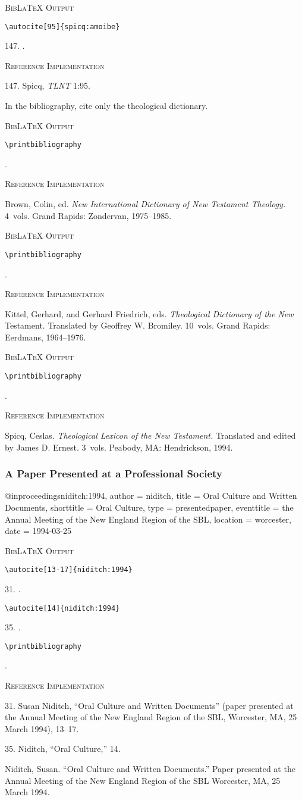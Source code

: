 \documentclass[a4paper]{article}
\newcommand\citetest[5]{%
  {\textsc{BibLaTeX Output}\par
   \nobreak
   \texttt{\textbackslash autocite[#2]\{#5\}}\par
   \color{biblatex-colour}
   #1. \cite[#2]{#5}.\par
   \color{black}
   \texttt{\textbackslash autocite[#4]\{#5\}}\par
   \color{biblatex-colour}
   #3. \cite[#4]{#5}.\par
   \color{black}
   \texttt{\textbackslash printbibliography}\par
   \color{biblatex-colour}
   \hangindent\bibindent\bibentrycite{#5}.\par}}
\newcommand\citetestlexns[3]{%
  {\textsc{BibLaTeX Output}\par
   \nobreak
   \texttt{\textbackslash autocite[#2]\{#3\}}\par
   \color{biblatex-colour}
   #1. \cite[#2]{#3}.\par}}
\newcommand\citetestbib[1]{%
  {\textsc{BibLaTeX Output}\par
   \nobreak
   \color{black}
   \texttt{\textbackslash printbibliography}\par
   \color{biblatex-colour}
   \hangindent\bibindent\bibentrycite{#1}.\par}}
\newenvironment{refimp}{%
  \begin{minipage}{\linewidth}
    \setlength{\parskip}{1ex}
    \textsc{Reference Implementation}\par
    \nobreak
    \color{reference-colour}
}{\end{minipage}}
\newenvironment{vb}{%
  \setlength{\parskip}{0pt}
  \verbatim}{\endverbatim}
\begin{document}
\citetestlexns{147}{95}{spicq:amoibe}

\begin{refimp}
  147. Spicq, \emph{TLNT} 1:95.
\end{refimp}

\bigskip

In the bibliography, cite only the theological dictionary.

\citetestbib{NIDNTT}

\begin{refimp}
  \hangindent\bibindent Brown, Colin, ed. \emph{New International Dictionary
  of New Testament Theology.} 4~vols. Grand Rapids: Zondervan, 1975–1985.
\end{refimp}

\citetestbib{TDNT}

\begin{refimp}
  \hangindent\bibindent Kittel, Gerhard, and Gerhard Friedrich, eds.
  \emph{Theological Dictionary of the New} Testament. Translated by Geoffrey
  W. Bromiley. 10~vols. Grand Rapids: Eerdmans, 1964–1976.
\end{refimp}

\citetestbib{TLNT}

\begin{refimp}
  \hangindent\bibindent Spicq, Ceslas. \emph{Theological Lexicon of the New
  Testament.} Translated and edited by James D. Ernest. 3~vols. Peabody, MA:
  Hendrickson, 1994.
\end{refimp}

\subsubsection{A Paper Presented at a Professional Society}

\begin{vb}
@inproceedings{niditch:1994,
  author = niditch,
  title = {Oral Culture and Written Documents},
  shorttitle = {Oral Culture},
  type = {presentedpaper},
  eventtitle = {the Annual Meeting of the New England Region
                of the SBL},
  location = worcester,
  date = {1994-03-25}
}
\end{vb}

\citetest{31}{13-17}{35}{14}{niditch:1994}

\begin{refimp}
  31. Susan Niditch, “Oral Culture and Written Documents” (paper presented at
  the Annual Meeting of the New England Region of the SBL, Worcester, MA, 25
  March 1994), 13–17.

  35. Niditch, “Oral Culture,” 14.

  \hangindent\bibindent Niditch, Susan. “Oral Culture and Written Documents.”
  Paper presented at the Annual Meeting of the New England Region of the SBL
  Worcester, MA, 25 March 1994.
\end{refimp}
\end{document}
